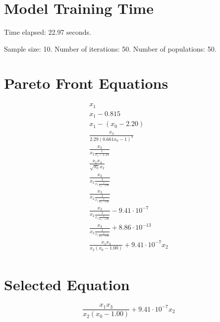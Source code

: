 \documentclass{article}
\begin{document}
\section*{Model Training Time}
Time elapsed: 22.97 seconds.

Sample size: 10.
Number of iterations: 50.
Number of populations: 50.

\section*{Pareto Front Equations}
\begin{align*}
x_{1} \\
x_{1} - 0.815 \\
x_{1} - \left(x_{0} - 2.20\right) \\
\frac{x_{3}}{2.29 \left(0.661 x_{0} - 1\right)^{2}} \\
\frac{x_{3}}{x_{2} \frac{1}{x_{1} - 1.19}} \\
\frac{x_{1} x_{3}}{\sqrt{x_{0}} x_{2}} \\
\frac{x_{3}}{x_{2} \frac{1}{x_{1} \frac{1}{x_{0} - 1.00}}} \\
\frac{x_{3}}{x_{2} \frac{1}{x_{1} \frac{1}{x_{0} - 1.00}}} \\
\frac{x_{3}}{x_{2} \frac{1}{x_{1} \frac{1}{x_{0} - 1.00}}} - 9.41 \cdot 10^{-7} \\
\frac{x_{3}}{x_{2} \frac{1}{x_{1} \frac{1}{x_{0} - 1.00}}} + 8.86 \cdot 10^{-13} \\
\frac{x_{1} x_{3}}{x_{2} \left(x_{0} - 1.00\right)} + 9.41 \cdot 10^{-7} x_{2} \\
\end{align*}

\section*{Selected Equation}
\[ \frac{x_{1} x_{3}}{x_{2} \left(x_{0} - 1.00\right)} + 9.41 \cdot 10^{-7} x_{2} \]
\end{document}
